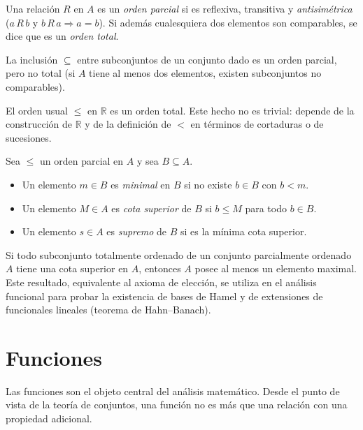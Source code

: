 \begin{definition}
\label{def:relacion-orden}
Una relación $R$ en $A$ es un \emph{orden parcial} si es reflexiva, transitiva y \emph{antisimétrica} ($a\,R\,b$ y $b\,R\,a\Rightarrow a=b$). Si además cualesquiera dos elementos son comparables, se dice que es un \emph{orden total}.
\end{definition}

\begin{example}
La inclusión $\subseteq$ entre subconjuntos de un conjunto dado es un orden parcial, pero no total (si $A$ tiene al menos dos elementos, existen subconjuntos no comparables).
\end{example}

\begin{example}
El orden usual $\leq$ en $\mathbb{R}$ es un orden total. Este hecho no es trivial: depende de la construcción de $\mathbb{R}$ y de la definición de $<$ en términos de cortaduras o de sucesiones.
\end{example}

\begin{definition}
Sea $\leq$ un orden parcial en $A$ y sea $B\subseteq A$.
\begin{itemize}
  \item Un elemento $m\in B$ es \emph{minimal} en $B$ si no existe $b\in B$ con $b<m$.
  \item Un elemento $M\in A$ es \emph{cota superior} de $B$ si $b\leq M$ para todo $b\in B$.
  \item Un elemento $s\in A$ es \emph{supremo} de $B$ si es la mínima cota superior.
\end{itemize}
\end{definition}

\begin{remark}
Si todo subconjunto totalmente ordenado de un conjunto parcialmente ordenado $A$ tiene una cota superior en $A$, entonces $A$ posee al menos un elemento maximal. Este resultado, equivalente al axioma de elección, se utiliza en el análisis funcional para probar la existencia de bases de Hamel y de extensiones de funcionales lineales (teorema de Hahn--Banach).
\end{remark}

\section{Funciones}

Las funciones son el objeto central del análisis matemático. Desde el punto de vista de la teoría de conjuntos, una función no es más que una relación con una propiedad adicional.

